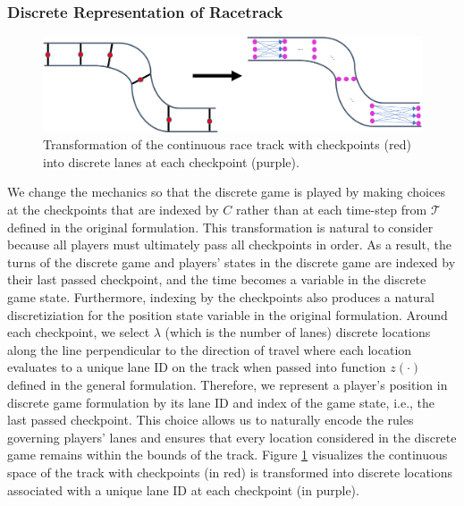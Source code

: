 \subsubsection{Discrete Representation of Racetrack}
\begin{figure}
\begin{center}
   \includegraphics[width=\textwidth]{Figures/TrackAbstraction.png}
\caption[Transformation of racetrack in original formulation to discrete formulation.]{Transformation of the continuous race track with checkpoints (red) into discrete lanes at each checkpoint (purple).}
\label{fig:racetrack_abs}
\end{center}
\end{figure}
We change the mechanics so that the discrete game is played by making choices at the checkpoints that are indexed by $C$ rather than at each time-step from $\mathcal{T}$ defined in the original formulation. This transformation is natural to consider because all players must ultimately pass all checkpoints in order. As a result, the turns of the discrete game and players' states in the discrete game are indexed by their last passed checkpoint, and the time becomes a variable in the discrete game state. Furthermore, indexing by the checkpoints also produces a natural discretiziation for the position state variable in the original formulation. Around each checkpoint, we select $\lambda$ (which is the number of lanes) discrete locations along the line perpendicular to the direction of travel where each location evaluates to a unique lane ID on the track when passed into function $z(\cdot)$ defined in the general formulation. Therefore, we represent a player's position in discrete game formulation by its lane ID and index of the game state, i.e., the last passed checkpoint. This choice allows us to naturally encode the rules governing players' lanes and ensures that every location considered in the discrete game remains within the bounds of the track. Figure \ref{fig:racetrack_abs} visualizes the continuous space of the track with checkpoints (in red) is transformed into discrete locations associated with a unique lane ID at each checkpoint (in purple). 

